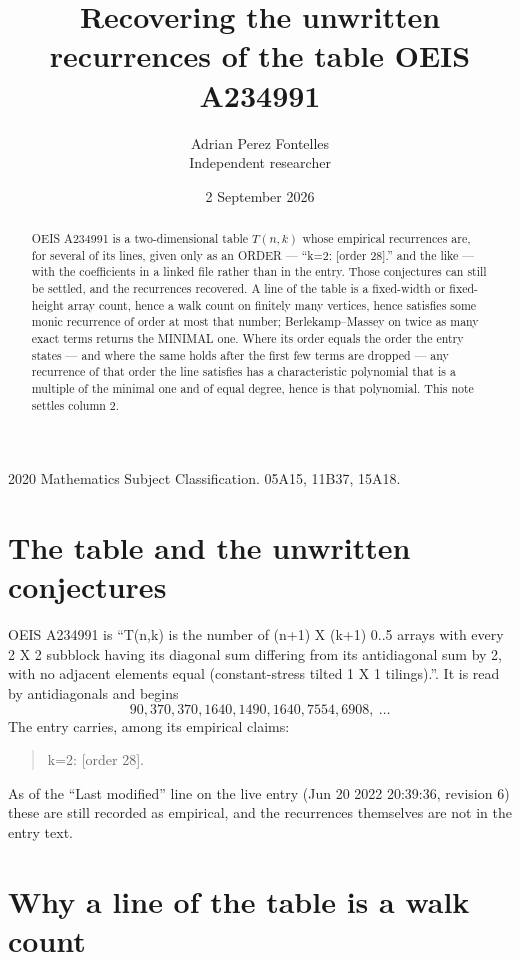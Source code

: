 \documentclass[11pt,a4paper]{article}
\title{Recovering the unwritten recurrences of the table OEIS A234991}
\author{Adrian Perez Fontelles\\ \small Independent researcher}
\date{2 September 2026}
\theoremstyle{plain}
\theoremstyle{definition}
\begin{document}
\maketitle

\begin{abstract}
OEIS A234991 is a two-dimensional table $T(n,k)$ whose empirical recurrences are, for several of
its lines, given only as an ORDER --- ``k=2: [order 28].'' and the like --- with the
coefficients in a linked file rather than in the entry. Those conjectures can still be settled,
and the recurrences recovered. A line of the table is a fixed-width or fixed-height array
count, hence a walk count on finitely many vertices, hence satisfies some monic recurrence of
order at most that number; Berlekamp--Massey on twice as many exact terms returns the MINIMAL
one. Where its order equals the order the entry states --- and where the same holds after the
first few terms are dropped --- any recurrence of that order the line satisfies has a
characteristic polynomial that is a multiple of the minimal one and of equal degree, hence is
that polynomial. This note settles column 2.
\end{abstract}

\noindent\small 2020 Mathematics Subject Classification. 05A15, 11B37, 15A18.\normalsize

\section{The table and the unwritten conjectures}

OEIS A234991 is ``T(n,k) is the number of (n+1) X (k+1) 0..5 arrays with every 2 X 2 subblock having its diagonal sum differing from its antidiagonal sum by 2, with no adjacent elements equal (constant-stress tilted 1 X 1 tilings).''. It is read by antidiagonals and begins
\[
90, 370, 370, 1640, 1490, 1640, 7554, 6908,\ \dots
\]
The entry carries, among its empirical claims:
\begin{quote}\small
k=2: [order 28].
\end{quote}
As of the ``Last modified'' line on the live entry (Jun 20 2022 20:39:36, revision 6) these are still
recorded as empirical, and the recurrences themselves are not in the entry text.

\section{Why a line of the table is a walk count}
\end{document}

